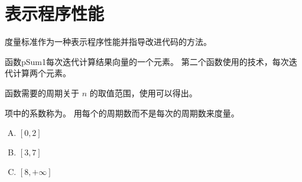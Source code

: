
\section{表示程序性能}
{
    度量标准作为一种表示程序性能并指导改进代码的方法。

    函数pSum1每次迭代计算结果向量的一个元素。
    第二个函数使用的技术，每次迭代计算两个元素。

    函数需要的周期关于 $n$ 的取值范围，使用可以得出。

    项中的系数称为。
    用每个的周期数而不是每次的周期数来度量。

    \begin{practicec}
        \begin{enumerate}[A.]
            \item $[0, 2]$
            \item $[3, 7]$
            \item $[8, +\infty]$
        \end{enumerate}
    \end{practicec}
}
